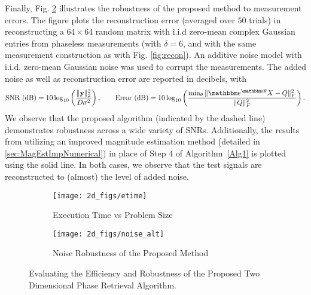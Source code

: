 Finally, Fig. \ref{fig:noise} illustrates the robustness of the proposed method to measurement errors.  The figure plots the reconstruction error (averaged over $50$ trials) in reconstructing a $64\times 64$ random matrix with i.i.d zero-mean complex Gaussian entries from phaseless measurements (with $\delta=6$, and with the same measurement construction as with Fig. \ref{fig:recon}). An additive noise model with i.i.d. zero-mean Gaussian noise was used to corrupt the measurements. The added noise as well as reconstruction error are reported in decibels, with
%
\[  \text{SNR (dB)} = 10 \log_{10}\left( \frac{\Vert \y \Vert_2^2}{D\sigma^2}\right), \qquad 
    \text{Error (dB)} = 10 \log_{10} \left( \frac{\min_\theta\Vert \mathbbm 
                e^{\mathbbm i \theta}X-Q\Vert^2_F}{\Vert Q\Vert^2_F}\right). \]
%
We observe that the proposed algorithm (indicated by the dashed line) demonstrates robustness across a wide variety of SNRs. Additionally, the results from utilizing an improved magnitude estimation method (detailed in \cref{sec:MagEstImpNumerical}) in place of Step 4 of Algorithm~\ref{Alg1} is plotted using the solid line. In both cases, we observe that the test signals are reconstructed to (almost) the level of added noise. 
%
\begin{figure}[hbtp]
    \centering
    \begin{subfigure}{0.495\textwidth}
        \centering
        \texttt{[image: 2d\_figs/etime]}
        \caption{Execution Time vs Problem Size}
        \label{fig:etime}
    \end{subfigure}
    \hfill
    \begin{subfigure}{0.495\textwidth}
        \centering
        \texttt{[image: 2d\_figs/noise\_alt]}
        \caption{Noise Robustness of the Proposed Method}
        \label{fig:noise}
    \end{subfigure} 
    \vspace{0.05in}
    \caption{Evaluating the Efficiency and Robustness of the Proposed Two Dimensional Phase
    Retrieval Algorithm.}
    \label{fig:perf}
\end{figure}
%
